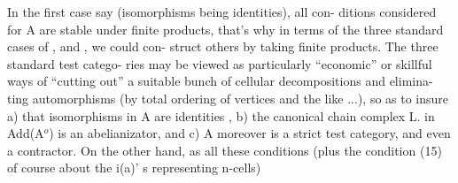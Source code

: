 In the first case say (isomorphisms being identities),  all con-%
ditions considered for A are stable under finite products,  that's why
in terms of the three standard cases of \hand{$\Delta$}, \hand{$\square$} and \hand{$\bigcirc$},  we could con-%
struct others by taking finite products.  The three standard test catego-%
ries  may be viewed as particularly ``economic'' or skillful ways of
``cutting out'' a suitable bunch of cellular decompositions\hand{,} and  elimina-%
ting automorphisms (by total ordering of vertices and the like ...),
so as to insure\hand{:} a) that isomorphisms in A are identities ,  b)  the
canonical chain complex L.  in Add(A$^{o}$)  is an abelianizator,  and  c)
A moreover is a strict test category,  and even a contractor.  On the
other hand,  as all these conditions  (plus the condition (15) of course
about the i(a)' s  representing n-cells)  

